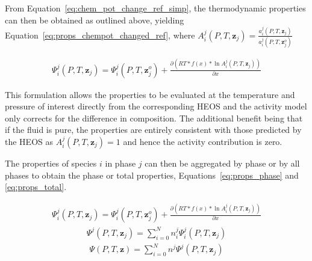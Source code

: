     From Equation~\ref{eq:chem_pot_change_ref_simp}, the thermodynamic properties can then be obtained as outlined above, yielding Equation~\ref{eq:props_chempot_changed_ref}, where \(A_i^{j} (P, T, \mathbf{z}_j) = \frac{a_i^{j} (P, T, \mathbf{z}_j)}{a_i^{j} (P, T, \mathbf{z}_j^o)}\)

    \begin{align}
        \Psi_i^{j} (P, T, \mathbf{z}_j) = \Psi_i^{j} (P, T, \mathbf{z}_{j}^o) + \frac{\partial \left(RT * f(x)* \ln A_i^{j} (P, T, \mathbf{z}_j) \right)}{\partial x} \label{eq:props_chempot_changed_ref}
    \end{align}

    This formulation allows the properties to be evaluated at the temperature and pressure of interest directly from the corresponding \ac{HEOS} and the activity model only corrects for the difference in composition. The additional benefit being that if the fluid is pure, the properties are entirely consistent with those predicted by the \ac{HEOS} as \(A_i^{j} (P, T, \mathbf{z}_j) = 1\) and hence the activity contribution is zero.

    The properties of species \(i\) in phase \(j\) can then be aggregated by phase or by all phases to obtain the phase or total properties, Equations~\ref{eq:props_phase} and \ref{eq:props_total}.

    \begin{align}
        \Psi_i^j (P, T, \mathbf{z}_j) = \Psi_i^j (P, T, \mathbf{z}_j^o) + \frac{\partial \left(RT * f(x)* \ln A_i^j (P, T, \mathbf{z}_j) \right)}{\partial x} \label{eq:props_comp_phase}
    \end{align}
    \begin{align}
        \Psi^j (P, T, \mathbf{z}_j) = \sum_{i=0}^N n_i^j\Psi_i^j (P, T, \mathbf{z}_j) \label{eq:props_phase}
    \end{align}
    \begin{align}
        \Psi (P, T, \mathbf{z}) = \sum_{i=0}^N n^j\Psi^j (P, T, \mathbf{z}_j) \label{eq:props_total}
    \end{align}

